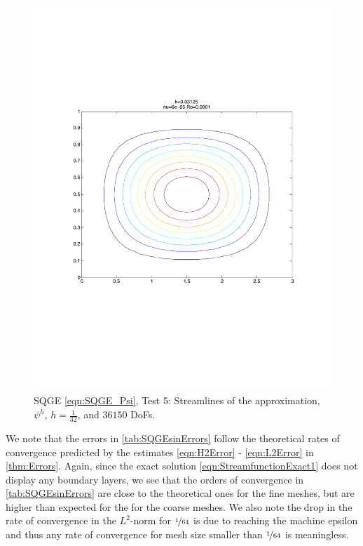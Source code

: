\begin{figure}%
  \begin{center}
    \includegraphics[scale=0.5]{Figures/SQGEsin.pdf}
    \caption{SQGE \eqref{eqn:SQGE_Psi}, Test 5: Streamlines of the approximation,
    $\psi^h$, $h=\frac{1}{32}$, and $36150$ DoFs.}
    \label{fig:SQGEsin}
  \end{center}
\end{figure}

We note that the errors in \autoref{tab:SQGEsinErrors} follow the theoretical
rates of convergence predicted by the estimates \eqref{eqn:H2Error} -
\eqref{eqn:L2Error} in \autoref{thm:Errors}. Again, since the exact solution
\eqref{eqn:StreamfunctionExact1} does not display any boundary layers, we see
that the orders of convergence in \autoref{tab:SQGEsinErrors} are close to the
theoretical ones for the fine meshes, but are higher than expected for the for
the coarse meshes. We also note the drop in the rate of convergence in the
$L^2$-norm for $\nicefrac{1}{64}$ is due to reaching the machine epsilon and
thus any rate of convergence for mesh size smaller than $\nicefrac{1}{64}$ is
meaningless.

